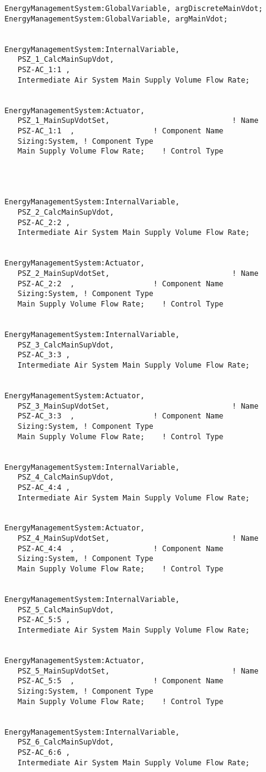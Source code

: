 \begin{lstlisting}
  EnergyManagementSystem:GlobalVariable, argDiscreteMainVdot;
  EnergyManagementSystem:GlobalVariable, argMainVdot;


  EnergyManagementSystem:InternalVariable,
     PSZ_1_CalcMainSupVdot,
     PSZ-AC_1:1 ,
     Intermediate Air System Main Supply Volume Flow Rate;


  EnergyManagementSystem:Actuator,
     PSZ_1_MainSupVdotSet,                            ! Name
     PSZ-AC_1:1  ,                  ! Component Name
     Sizing:System, ! Component Type
     Main Supply Volume Flow Rate;    ! Control Type




  EnergyManagementSystem:InternalVariable,
     PSZ_2_CalcMainSupVdot,
     PSZ-AC_2:2 ,
     Intermediate Air System Main Supply Volume Flow Rate;


  EnergyManagementSystem:Actuator,
     PSZ_2_MainSupVdotSet,                            ! Name
     PSZ-AC_2:2  ,                  ! Component Name
     Sizing:System, ! Component Type
     Main Supply Volume Flow Rate;    ! Control Type


  EnergyManagementSystem:InternalVariable,
     PSZ_3_CalcMainSupVdot,
     PSZ-AC_3:3 ,
     Intermediate Air System Main Supply Volume Flow Rate;


  EnergyManagementSystem:Actuator,
     PSZ_3_MainSupVdotSet,                            ! Name
     PSZ-AC_3:3  ,                  ! Component Name
     Sizing:System, ! Component Type
     Main Supply Volume Flow Rate;    ! Control Type


  EnergyManagementSystem:InternalVariable,
     PSZ_4_CalcMainSupVdot,
     PSZ-AC_4:4 ,
     Intermediate Air System Main Supply Volume Flow Rate;


  EnergyManagementSystem:Actuator,
     PSZ_4_MainSupVdotSet,                            ! Name
     PSZ-AC_4:4  ,                  ! Component Name
     Sizing:System, ! Component Type
     Main Supply Volume Flow Rate;    ! Control Type


  EnergyManagementSystem:InternalVariable,
     PSZ_5_CalcMainSupVdot,
     PSZ-AC_5:5 ,
     Intermediate Air System Main Supply Volume Flow Rate;


  EnergyManagementSystem:Actuator,
     PSZ_5_MainSupVdotSet,                            ! Name
     PSZ-AC_5:5  ,                  ! Component Name
     Sizing:System, ! Component Type
     Main Supply Volume Flow Rate;    ! Control Type


  EnergyManagementSystem:InternalVariable,
     PSZ_6_CalcMainSupVdot,
     PSZ-AC_6:6 ,
     Intermediate Air System Main Supply Volume Flow Rate;



\end{lstlisting}
